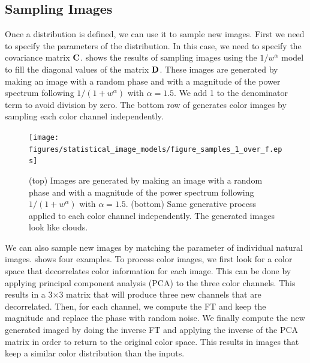 %


\subsection{Sampling Images}

Once a distribution is defined, we can use it to sample new images. First we need to specify the parameters of the distribution. In this case, we need to specify the covariance matrix ${\bf C}$. \Fig{\ref{fig:figure_samples_1_over_f}} shows the results of sampling images using the $1/ w^\alpha$ model to fill the diagonal values of the matrix ${\bf D}$. These images are generated by making an image with a random phase and with a magnitude of the power spectrum following $1/(1+w ^\alpha)$ with $\alpha=1.5$. We add 1 to the denominator term to avoid division by zero. The bottom row of \fig{\ref{fig:figure_samples_1_over_f}} generates color images by sampling each color channel independently. 



\begin{figure}
\centerline{
\texttt{[image: figures/statistical\_image\_models/figure\_samples\_1\_over\_f.eps]}
} 
\caption{(top) Images are generated by making an image with a random phase and with a magnitude of the power spectrum following $1/ (1+w ^\alpha)$ with $\alpha=1.5$. (bottom) Same generative process applied to each color channel independently. The generated images look like clouds.
} 
\label{fig:figure_samples_1_over_f}
\end{figure}




We can also sample new images by matching the parameter of individual natural images. \Fig{\ref{fig:magFTMatch}} shows four examples. To process color images, we first look for a color space that decorrelates color information for each image. This can be done by applying principal component analysis (PCA) to the three color channels. This results in a 3$\times$3 matrix that will produce three new channels that are decorrelated. Then, for each channel, we compute the FT and keep the magnitude and replace the phase with random noise. We finally compute the new generated imaged by doing the inverse FT and applying the inverse of the PCA matrix in order to return to the original color space. This results in images that keep a similar color distribution than the inputs. 


